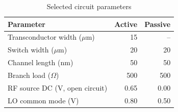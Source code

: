 
\begin{table}[!b]
\caption{Selected circuit parameters}
\label{tab:design}
\centering\footnotesize
\setlength{\tabcolsep}{4pt}
\begin{tabularx}{\columnwidth}{@{}Xrr@{}}
\toprule
Parameter & Active & Passive \\
\midrule
Transconductor width ($\mu$m) & 15 & -- \\
Switch width ($\mu$m) & 20 & 20 \\
Channel length (nm) & 50 & 50 \\
Branch load ($\Omega$) & 500 & 500 \\
RF source DC (V, open circuit) & 0.65 & 0.00 \\
LO common mode (V) & 0.80 & 0.50 \\
\bottomrule
\end{tabularx}
\end{table}
